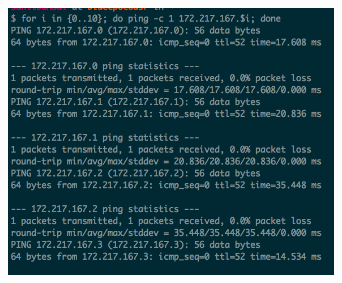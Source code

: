 \documentclass[]{report}
\begin{document}
\begin{itemize}
	\begin{figure}[H]
		\vspace{0pt}
		\includegraphics[height = 200pt, keepaspectratio]{Snapshots/exe9/q9_4.png}
	\end{figure}  
\end{itemize}
\end{document}
